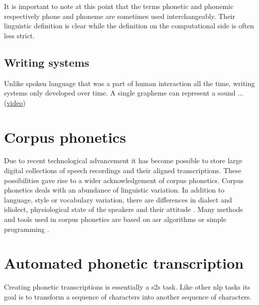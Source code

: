 It is important to note at this point that the terms phonetic and phonemic respectively phone and phoneme are sometimes used interchangeably. Their linguistic definition is clear while the definition on the computational side is often less strict. 

\subsection*{Writing systems}
Unlike spoken language that was a part of human interaction all the time, writing systems only developed over time. A single grapheme can represent a sound ... (\href{https://www.youtube.com/watch?v=-sUUWyo4RZQ&list=PL8dPuuaLjXtP5mp25nStsuDzk2blncJDW&index=17}{video})



\section{Corpus phonetics}
Due to recent technological advancement it has become possible to store large digital collections of speech recordings and their aligned transcriptions. These possibilities gave rise to a wider acknowledgement of corpus phonetics. Corpus phonetics deals with an abundance of linguistic variation. In addition to language, style or vocabulary variation, there are differences in dialect and idiolect, physiological state of the speakers and their attitude \citep{Liberman.2019, Chodroff.19.07.2019}. Many methods and tools used in corpus phonetics are based on \ac{asr} algorithms or simple programming \citep{Chodroff.19.07.2019}.

\section{Automated phonetic transcription}
Creating phonetic transcriptions is essentially a \ac{s2s} task. Like other \ac{nlp} tasks its goal is to transform a sequence of characters into another sequence of characters.  

